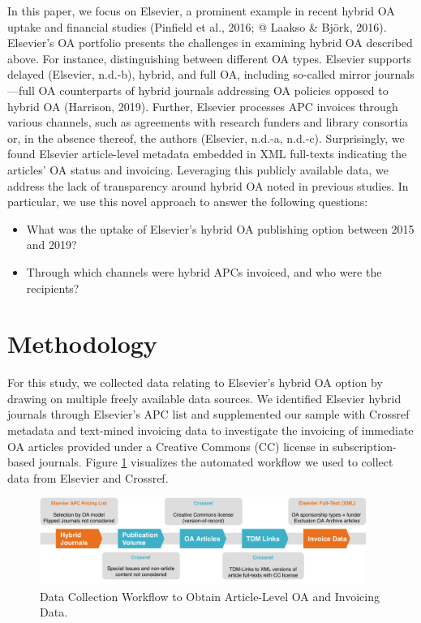 \documentclass[a4paper,man,floatsintext,longtable,noextraspace,12pt]{apa6}
\providecommand{\tightlist}{%
  \setlength{\itemsep}{0pt}\setlength{\parskip}{0pt}}
\begin{document}
In this paper, we focus on Elsevier, a prominent example in recent
hybrid OA uptake and financial studies (Pinfield et al., 2016; @ Laakso
\& Björk, 2016). Elsevier's OA portfolio presents the challenges in
examining hybrid OA described above. For instance, distinguishing
between different OA types. Elsevier supports delayed (Elsevier,
n.d.-b), hybrid, and full OA, including so-called mirror journals---full
OA counterparts of hybrid journals addressing OA policies opposed to
hybrid OA (Harrison, 2019). Further, Elsevier processes APC invoices
through various channels, such as agreements with research funders and
library consortia or, in the absence thereof, the authors (Elsevier,
n.d.-a, n.d.-c). Surprisingly, we found Elsevier article-level metadata
embedded in XML full-texts indicating the articles' OA status and
invoicing. Leveraging this publicly available data, we address the lack
of transparency around hybrid OA noted in previous studies. In
particular, we use this novel approach to answer the following
questions:

\begin{itemize}
\tightlist
\item
  What was the uptake of Elsevier's hybrid OA publishing option between
  2015 and 2019?
\item
  Through which channels were hybrid APCs invoiced, and who were the
  recipients?
\end{itemize}

\hypertarget{methodology}{%
\section{Methodology}\label{methodology}}

For this study, we collected data relating to Elsevier's hybrid OA
option by drawing on multiple freely available data sources. We
identified Elsevier hybrid journals through Elsevier's APC list and
supplemented our sample with Crossref metadata and text-mined invoicing
data to investigate the invoicing of immediate OA articles provided
under a Creative Commons (CC) license in subscription-based journals.
Figure \ref{fig:workflow} visualizes the automated workflow we used to
collect data from Elsevier and Crossref.

\begin{figure}[H]

{\centering \includegraphics[width=0.95\textwidth]{../figure/els_flow.pdf}

}

\caption{Data Collection Workflow to Obtain Article-Level OA and Invoicing Data.
}\label{fig:workflow}
\end{figure}
\end{document}
